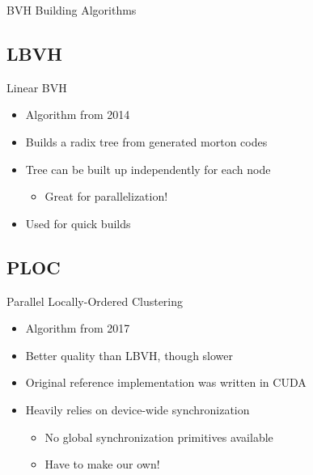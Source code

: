 \documentclass[aspectratio=169,t]{beamer}
\begin{document}
\chapterIntroConfig
\begin{slide}{BVH Building Algorithms}
\end{slide}

\subsection{LBVH}

\begin{slide}{Linear BVH}
  \begin{itemize}
   \item Algorithm from 2014
   \item Builds a radix tree from generated morton codes
   \item Tree can be built up independently for each node
   \begin{itemize}
    \item Great for parallelization!
   \end{itemize}
   \item Used for quick builds
  \end{itemize}
\end{slide}

\subsection{PLOC}

\begin{slide}{Parallel Locally-Ordered Clustering}
  \begin{itemize}
   \item Algorithm from 2017
   \item Better quality than LBVH, though slower
   \item Original reference implementation was written in CUDA
   \item Heavily relies on device-wide synchronization
   \begin{itemize}
    \item No global synchronization primitives available
    \item Have to make our own!
   \end{itemize}
  \end{itemize}
\end{slide}
\end{document}
